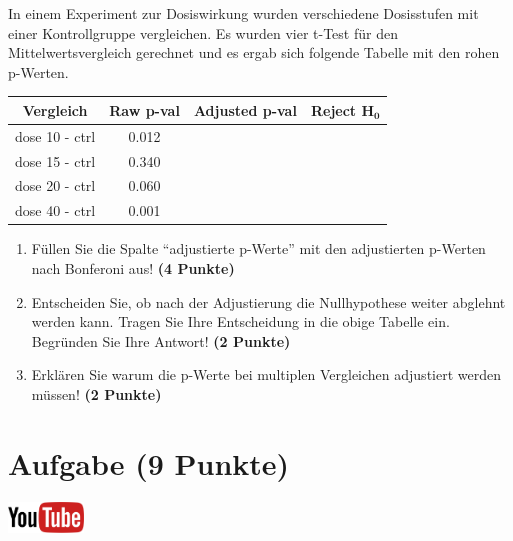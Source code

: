 \documentclass[a4paper, 10pt]{scrartcl}\usepackage[]{graphicx}\usepackage[]{xcolor}
\begin{document}
In einem Experiment zur Dosiswirkung wurden verschiedene Dosisstufen mit
einer Kontrollgruppe vergleichen. Es wurden vier t-Test f{\"u}r den
Mittelwertsvergleich gerechnet und es ergab sich folgende Tabelle mit den
rohen p-Werten.



\begin{center}
  \Large
  \begin{tabular}{c|c|c|c}
    \textbf{Vergleich} & \textbf{Raw p-val} & \textbf{Adjusted p-val} &
                                                                        \textbf{Reject $\boldsymbol{H_0}$} \strut\\
    \hline
    dose 10 - ctrl  & 0.012 &  &\strut\\
    \hline
    dose 15 - ctrl  & 0.340 & &\strut\\
    \hline
    dose 20 - ctrl  & 0.060 & &\strut\\
    \hline
    dose 40 - ctrl  & 0.001 & &\strut\\
  \end{tabular}
\end{center}

\begin{enumerate}
\item F{\"u}llen Sie die Spalte "`adjustierte p-Werte"' mit den adjustierten
  p-Werten nach Bonferoni aus! \textbf{(4 Punkte)}
\item Entscheiden Sie, ob nach der Adjustierung die Nullhypothese weiter
  abglehnt werden kann. Tragen Sie Ihre Entscheidung in die obige Tabelle
  ein. Begr{\"u}nden Sie Ihre Antwort! \textbf{(2 Punkte)}
\item Erkl{\"a}ren Sie warum die p-Werte bei multiplen Vergleichen
  adjustiert werden m{\"u}ssen! \textbf{(2 Punkte)}
\end{enumerate}

\vspace{1Ex}

 
\clearpage

\section{Aufgabe \hfill (9 Punkte)}

 \hfill\href{https://youtu.be/RagTFFKFbFg}{\includegraphics[width =
   2cm]{img/youtube}}\\[1Ex]
\end{document}
